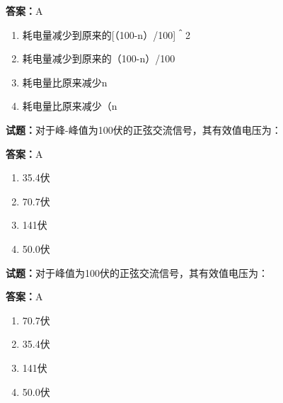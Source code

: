 \documentclass{ctexbook}
\begin{document}
\textbf{答案：}A 

\begin{enumerate}[leftmargin=3em]
  \item 耗电量减少到原来的[（100-n）/100]＾2 

  \item 耗电量减少到原来的（100-n）/100 

  \item 耗电量比原来减少n%

  \item 耗电量比原来减少（n%

\end{enumerate}





\vspace{1em}

\textbf{试题：}对于峰-峰值为100伏的正弦交流信号，其有效值电压为： 

\textbf{答案：}A 

\begin{enumerate}[leftmargin=3em]
  \item 35.4伏 

  \item 70.7伏 

  \item 141伏 

  \item 50.0伏 


\end{enumerate}





\vspace{1em}

\textbf{试题：}对于峰值为100伏的正弦交流信号，其有效值电压为： 

\textbf{答案：}A 

\begin{enumerate}[leftmargin=3em]
  \item 70.7伏 

  \item 35.4伏 

  \item 141伏 

  \item 50.0伏 

\end{enumerate}
\end{document}
